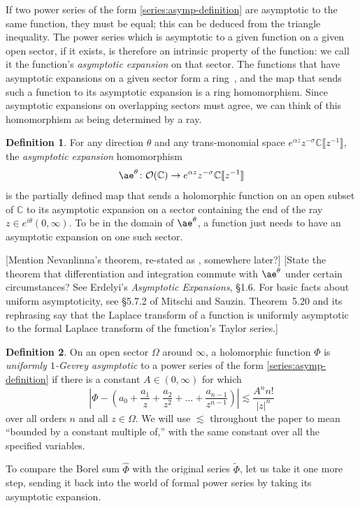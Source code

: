 \documentclass{article}
\newcommand{\maps}{\colon}
\newcommand{\C}{\mathbb{C}}
\newcommand{\series}[1]{\tilde{#1}}
\newcommand{\aexp}{\mathrm{\ae}}
\theoremstyle{definition}
\newtheorem{definition}{Definition}[section]
\theoremstyle{plain}
\newenvironment{todo}{\color{Coral}}{\color{black}}
\begin{document}
If two power series of the form \eqref{series:asymp-definition} are asymptotic to the same function, they must be equal; this can be deduced from the triangle inequality. The power series which is asymptotic to a given function on a given open sector, if it exists, is therefore an intrinsic property of the function: we call it the function's {\em asymptotic expansion} on that sector. The functions that have asymptotic expansions on a given sector form a ring~\cite[Section~A.4]{nikolaev2023existence}, and the map that sends such a function to its asymptotic expansion is a ring homomorphism. Since asymptotic expansions on overlapping sectors must agree, we can think of this homomorphism as being determined by a ray.
\begin{definition}
For any direction $\theta$ and any trans-monomial space $e^{\alpha z} z^{-\sigma} \C \llbracket z^{-1} \rrbracket$, the {\em asymptotic expansion} homomorphism
\[ \aexp^\theta \maps \mathcal{O}(\C) \to e^{\alpha z} z^{-\sigma} \C \llbracket z^{-1} \rrbracket \]
is the partially defined map that sends a holomorphic function on an open subset of $\C$ to its asymptotic expansion on a sector containing the end of the ray $z \in e^{i\theta}(0, \infty)$. To be in the domain of $\aexp^\theta$, a function just needs to have an asymptotic expansion on one such sector.
\end{definition}
\begin{todo}[Mention Nevanlinna's theorem, re-stated as \cite[Theorem~C.11]{nikolaev2023existence}, somewhere later?]\end{todo}
\begin{todo}[State the theorem that differentiation and integration commute with $\aexp^\theta$ under certain circumstances? See Erdelyi's {\em Asymptotic Expansions}, \S 1.6. For basic facts about uniform asymptoticity, see \S 5.7.2 of Mitschi and Sauzin. Theorem~5.20 and its rephrasing say that the Laplace transform of a function is uniformly asymptotic to the formal Laplace transform of the function's Taylor series.]\end{todo}

\begin{definition}\label{def:unif-gevrey-asymp}
On an open sector $\Omega$ around $\infty$, a holomorphic function $\Phi$ is {\em uniformly $1$-Gevrey asymptotic} to a power series of the form \eqref{series:asymp-definition} if there is a constant $A \in (0, \infty)$ for which
\[ \left|\Phi - \left(a_0 + \frac{a_1}{z} + \frac{a_2}{z^2} + \ldots + \frac{a_{n-1}}{z^{n-1}} \right) \right| \lesssim \frac{A^n n!}{|z|^n} \]
over all orders $n$ and all $z \in \Omega$. We will use $\lesssim$ throughout the paper to mean ``bounded by a constant multiple of,'' with the same constant over all the specified variables.
\end{definition}
To compare the Borel sum $\hat{\Phi}$ with the original series $\series{\Phi}$, let us take it one more step, sending it back into the world of formal power series by taking its asymptotic expansion.
\end{document}
